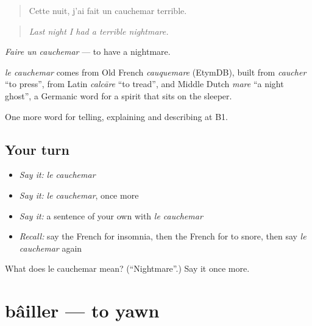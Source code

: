 \begin{quote}
Cette nuit, j'ai fait un cauchemar terrible.
\end{quote}

\begin{quote}
\emph{Last night I had a terrible nightmare.}
\end{quote}

\emph{Faire un cauchemar} — to have a nightmare.

\begin{cousinweb}
\emph{le cauchemar} comes from Old French \emph{cauquemare} (EtymDB), built from \emph{caucher} \textquotedblleft{}to press\textquotedblright{}, from Latin \emph{calcāre} \textquotedblleft{}to tread\textquotedblright{}, and Middle Dutch \emph{mare} \textquotedblleft{}a night ghost\textquotedblright{}, a Germanic word for a spirit that sits on the sleeper.
\end{cousinweb}

\begin{grammarlens}[title={What you've built}]
One more word for telling, explaining and describing at B1.
\end{grammarlens}

\subsection*{Your turn}
\begin{itemize}
\raggedright
  \item \emph{Say it:} \emph{le cauchemar}
  \item \emph{Say it:} \emph{le cauchemar}, once more
  \item \emph{Say it:} a sentence of your own with \emph{le cauchemar}
  \item \emph{Recall:} say the French for insomnia, then the French for to snore, then say \emph{le cauchemar} again
\end{itemize}

\begin{tcolorbox}[breakable,colback=teal!4,colframe=teal!35!black,title={Before you move on}]
What does le cauchemar mean? (\textquotedblleft{}Nightmare\textquotedblright{}.) Say it once more.
\end{tcolorbox}
\section[bâiller]{bâiller — to yawn}

\label{lesson:FR-C486-bailler}



